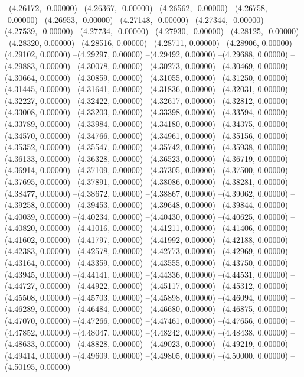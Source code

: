 --(4.26172, -0.00000)
--(4.26367, -0.00000)
--(4.26562, -0.00000)
--(4.26758, -0.00000)
--(4.26953, -0.00000)
--(4.27148, -0.00000)
--(4.27344, -0.00000)
--(4.27539, -0.00000)
--(4.27734, -0.00000)
--(4.27930, -0.00000)
--(4.28125, -0.00000)
--(4.28320, 0.00000)
--(4.28516, 0.00000)
--(4.28711, 0.00000)
--(4.28906, 0.00000)
--(4.29102, 0.00000)
--(4.29297, 0.00000)
--(4.29492, 0.00000)
--(4.29688, 0.00000)
--(4.29883, 0.00000)
--(4.30078, 0.00000)
--(4.30273, 0.00000)
--(4.30469, 0.00000)
--(4.30664, 0.00000)
--(4.30859, 0.00000)
--(4.31055, 0.00000)
--(4.31250, 0.00000)
--(4.31445, 0.00000)
--(4.31641, 0.00000)
--(4.31836, 0.00000)
--(4.32031, 0.00000)
--(4.32227, 0.00000)
--(4.32422, 0.00000)
--(4.32617, 0.00000)
--(4.32812, 0.00000)
--(4.33008, 0.00000)
--(4.33203, 0.00000)
--(4.33398, 0.00000)
--(4.33594, 0.00000)
--(4.33789, 0.00000)
--(4.33984, 0.00000)
--(4.34180, 0.00000)
--(4.34375, 0.00000)
--(4.34570, 0.00000)
--(4.34766, 0.00000)
--(4.34961, 0.00000)
--(4.35156, 0.00000)
--(4.35352, 0.00000)
--(4.35547, 0.00000)
--(4.35742, 0.00000)
--(4.35938, 0.00000)
--(4.36133, 0.00000)
--(4.36328, 0.00000)
--(4.36523, 0.00000)
--(4.36719, 0.00000)
--(4.36914, 0.00000)
--(4.37109, 0.00000)
--(4.37305, 0.00000)
--(4.37500, 0.00000)
--(4.37695, 0.00000)
--(4.37891, 0.00000)
--(4.38086, 0.00000)
--(4.38281, 0.00000)
--(4.38477, 0.00000)
--(4.38672, 0.00000)
--(4.38867, 0.00000)
--(4.39062, 0.00000)
--(4.39258, 0.00000)
--(4.39453, 0.00000)
--(4.39648, 0.00000)
--(4.39844, 0.00000)
--(4.40039, 0.00000)
--(4.40234, 0.00000)
--(4.40430, 0.00000)
--(4.40625, 0.00000)
--(4.40820, 0.00000)
--(4.41016, 0.00000)
--(4.41211, 0.00000)
--(4.41406, 0.00000)
--(4.41602, 0.00000)
--(4.41797, 0.00000)
--(4.41992, 0.00000)
--(4.42188, 0.00000)
--(4.42383, 0.00000)
--(4.42578, 0.00000)
--(4.42773, 0.00000)
--(4.42969, 0.00000)
--(4.43164, 0.00000)
--(4.43359, 0.00000)
--(4.43555, 0.00000)
--(4.43750, 0.00000)
--(4.43945, 0.00000)
--(4.44141, 0.00000)
--(4.44336, 0.00000)
--(4.44531, 0.00000)
--(4.44727, 0.00000)
--(4.44922, 0.00000)
--(4.45117, 0.00000)
--(4.45312, 0.00000)
--(4.45508, 0.00000)
--(4.45703, 0.00000)
--(4.45898, 0.00000)
--(4.46094, 0.00000)
--(4.46289, 0.00000)
--(4.46484, 0.00000)
--(4.46680, 0.00000)
--(4.46875, 0.00000)
--(4.47070, 0.00000)
--(4.47266, 0.00000)
--(4.47461, 0.00000)
--(4.47656, 0.00000)
--(4.47852, 0.00000)
--(4.48047, 0.00000)
--(4.48242, 0.00000)
--(4.48438, 0.00000)
--(4.48633, 0.00000)
--(4.48828, 0.00000)
--(4.49023, 0.00000)
--(4.49219, 0.00000)
--(4.49414, 0.00000)
--(4.49609, 0.00000)
--(4.49805, 0.00000)
--(4.50000, 0.00000)
--(4.50195, 0.00000)
